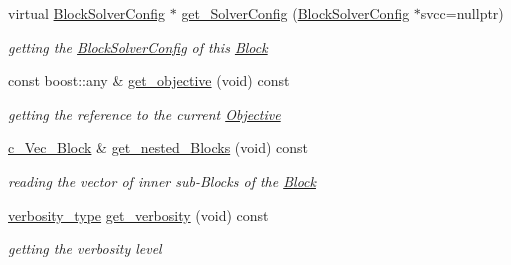 \begin{Indent}
\begin{DoxyCompactItemize}
virtual \mbox{\hyperlink{class_s_m_spp__di__unipi__it_1_1_block_solver_config}{Block\+Solver\+Config}} $\ast$ \mbox{\hyperlink{class_s_m_spp__di__unipi__it_1_1_block_a412a4ff2922e8d95f80589b1f6522d77}{get\+\_\+\+Solver\+Config}} (\mbox{\hyperlink{class_s_m_spp__di__unipi__it_1_1_block_solver_config}{Block\+Solver\+Config}} $\ast$svcc=nullptr)
\begin{DoxyCompactList}\small\item\em getting the \mbox{\hyperlink{class_s_m_spp__di__unipi__it_1_1_block_solver_config}{Block\+Solver\+Config}} of this \mbox{\hyperlink{class_s_m_spp__di__unipi__it_1_1_block}{Block}} \end{DoxyCompactList}\item 
const boost\+::any \& \mbox{\hyperlink{class_s_m_spp__di__unipi__it_1_1_block_afed5fdabb9a34885aaa38c3dd4e67834}{get\+\_\+objective}} (void) const
\begin{DoxyCompactList}\small\item\em getting the reference to the current \mbox{\hyperlink{class_s_m_spp__di__unipi__it_1_1_objective}{Objective}} \end{DoxyCompactList}\item 
\mbox{\hyperlink{group___block___t_y_p_e_s_ga7cbe2d2777d0b63cf75c041bf7e60dff}{c\+\_\+\+Vec\+\_\+\+Block}} \& \mbox{\hyperlink{class_s_m_spp__di__unipi__it_1_1_block_a39bc932e28075740f08b392830a67e03}{get\+\_\+nested\+\_\+\+Blocks}} (void) const
\begin{DoxyCompactList}\small\item\em reading the vector of inner sub-\/\+Blocks of the \mbox{\hyperlink{class_s_m_spp__di__unipi__it_1_1_block}{Block}} \end{DoxyCompactList}\item 
\mbox{\label{class_s_m_spp__di__unipi__it_1_1_block_a3b7d60547b0ebd9fcf9aaf62dc7358cf}} 
\mbox{\hyperlink{class_s_m_spp__di__unipi__it_1_1_block_aae1eff6b4e72eef08cf2d8334500f9b6}{verbosity\+\_\+type}} \mbox{\hyperlink{class_s_m_spp__di__unipi__it_1_1_block_a3b7d60547b0ebd9fcf9aaf62dc7358cf}{get\+\_\+verbosity}} (void) const
\begin{DoxyCompactList}\small\item\em getting the verbosity level \end{DoxyCompactList}\end{DoxyCompactItemize}
\end{Indent}
